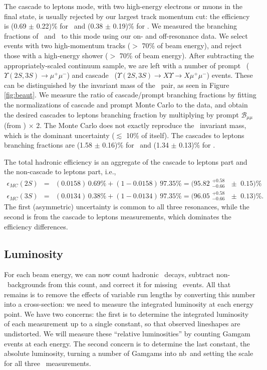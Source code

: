 \documentclass[aps,prd,preprint,superscriptaddress,tightenlines,nofootinbib,floatfix]{revtex4}
\begin{document}
The cascade to leptons mode, with two high-energy electrons or muons
in the final state, is usually rejected by our largest track momentum
cut: the efficiency is (0.69 $\pm$ 0.22)\% for \utwo\ and (0.38 $\pm$
0.19)\% for \uthree.  We measured the branching fractions of \utwo\
and \uthree\ to this mode using our on- and off-resonance data.  We
select events with two high-momentum tracks ($>$ 70\% of beam energy),
and reject those with a high-energy shower ($>$ 70\% of beam energy).
After subtracting the appropriately-scaled continuum sample, we are
left with a number of prompt \mm\ ($\Upsilon(2S,3S) \to \mu^+\mu^-$)
and cascade \mm\ ($\Upsilon(2S,3S) \to X \Upsilon \to X \mu^+\mu^-$)
events.  These can be distinguished by the invariant mass of the \mm\
pair, as seen in Figure \ref{fig:beaut}.  We measure the ratio of
cascade/prompt branching fractions by fitting the normalizations of
cascade and prompt Monte Carlo to the data, and obtain the desired
cascades to leptons branching fraction by multiplying by prompt
$\mathcal{B}_{\mu\mu}$ (from \cite{istvan}) $\times$ 2.  The Monte
Carlo does not exactly reproduce the \mm\ invariant mass, which is the
dominant uncertainty ($\lesssim$ 10\% of itself).  The cascades to
leptons branching fractions are (1.58 $\pm$ 0.16)\% for \utwo\ and
(1.34 $\pm$ 0.13)\% for \uthree.

The total hadronic efficiency is an aggregate of the cascade to
leptons part and the non-cascade to leptons part, i.e.,
\begin{eqnarray}
  \epsilon_{MC}(2S) &=& (0.0158) \, 0.69\% + (1 - 0.0158) \, 97.35\% = \mbox{(95.82 $^{+0.58}_{-0.66}$ $\pm$ 0.15)\%} \nonumber \\
  \epsilon_{MC}(3S) &=& (0.0134) \, 0.38\% + (1 - 0.0134) \, 97.35\% = \mbox{(96.05 $^{+0.58}_{-0.66}$ $\pm$ 0.13)\%.} \nonumber
\end{eqnarray}
The first (asymmetric) uncertainty is common to all three resonances,
while the second is from the cascade to leptons measurements, which
dominates the efficiency differences.

%
\subsection{Luminosity}
%

For each beam energy, we can now count hadronic \ups\ decays, subtract
non-\ups\ backgrounds from this count, and correct it for missing
\ups\ events.  All that remains is to remove the effects of variable
run lengths by converting this number into a cross-section: we need to
measure the integrated luminosity at each energy point.  We have two
concerns: the first is to determine the integrated luminosity of each
measurement up to a single constant, so that observed lineshapes are
undistorted.  We will measure these ``relative luminosities'' by
counting Gamgam events at each energy.  The second concern is to
determine the last constant, the absolute luminosity, turning a number
of Gamgams into nb\inv\ and setting the scale for all three \gee\
measurements.
\end{document}
